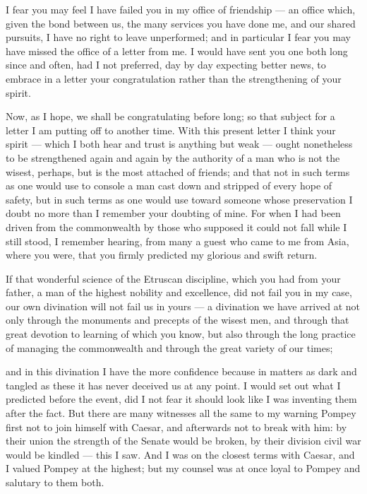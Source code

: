

 I fear you may feel I have failed you in my office of friendship --- an office which, given the bond between us, the many services you have done me, and our shared pursuits, I have no right to leave unperformed; and in particular I fear you may have missed the office of a letter from me. I would have sent you one both long since and often, had I not preferred, day by day expecting better news, to embrace in a letter your congratulation rather than the strengthening of your spirit.

 Now, as I hope, we shall be congratulating before long; so that subject for a letter I am putting off to another time. With this present letter I think your spirit --- which I both hear and trust is anything but weak --- ought nonetheless to be strengthened again and again by the authority of a man who is not the wisest, perhaps, but is the most attached of friends; and that not in such terms as one would use to console a man cast down and stripped of every hope of safety, but in such terms as one would use toward someone whose preservation I doubt no more than I remember your doubting of mine. For when I had been driven from the commonwealth by those who supposed it could not fall while I still stood, I remember hearing, from many a guest who came to me from Asia, where you were, that you firmly predicted my glorious and swift return.

 If that wonderful science of the Etruscan discipline, which you had from your father, a man of the highest nobility and excellence, did not fail you in my case, our own divination will not fail us in yours --- a divination we have arrived at not only through the monuments and precepts of the wisest men, and through that great devotion to learning of which you know, but also through the long practice of managing the commonwealth and through the great variety of our times;

 and in this divination I have the more confidence because in matters as dark and tangled as these it has never deceived us at any point. I would set out what I predicted before the event, did I not fear it should look like I was inventing them after the fact. But there are many witnesses all the same to my warning Pompey first not to join himself with Caesar, and afterwards not to break with him: by their union the strength of the Senate would be broken, by their division civil war would be kindled --- this I saw. And I was on the closest terms with Caesar, and I valued Pompey at the highest; but my counsel was at once loyal to Pompey and salutary to them both.

